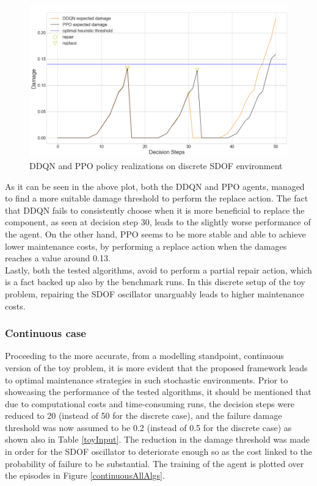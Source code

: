 \begin{figure}[H]
    \centering
	\includegraphics[width=\linewidth]{Figures/discretePolicies.png}
	\caption{\gls{DDQN} and \gls{PPO} policy realizations on discrete \gls{SDOF} environment}
	\label{discretePolicy}
\end{figure}

As it can be seen in the above plot, both the \gls{DDQN} and \gls{PPO} agents, managed to find a more suitable damage threshold to perform the replace action. The fact that \gls{DDQN} fails to consistently choose when it is more beneficial to replace the component, as seen at decision step 30, leads to the slightly worse performance of the agent. On the other hand, \gls{PPO} seems to be more stable and able to achieve lower maintenance costs, by performing a replace action when the damages reaches a value around 0.13.\\

Lastly, both the tested algorithms, avoid to perform a partial repair action, which is a fact backed up also by the benchmark runs. In this discrete setup of the toy problem, repairing the \gls{SDOF} oscillator unarguably leads to higher maintenance costs.


\subsubsection{Continuous case}

Proceeding to the more accurate, from a modelling standpoint, continuous version of the toy problem, it is more evident that the proposed framework leads to optimal maintenance strategies in such stochastic environments. Prior to showcasing the performance of the tested algorithms, it should be mentioned that due to computational costs and time-consuming runs, the decision steps were reduced to 20 (instead of 50 for the discrete case), and the failure damage threshold was now assumed to be 0.2 (instead of 0.5 for the discrete case) as shown also in Table \ref{toyInput}. The reduction in the damage threshold was made in order for the \gls{SDOF} oscillator to deteriorate enough so as the cost linked to the probability of failure to be substantial. The training of the agent is plotted over the episodes in Figure \ref{continuousAllAlgs}.

